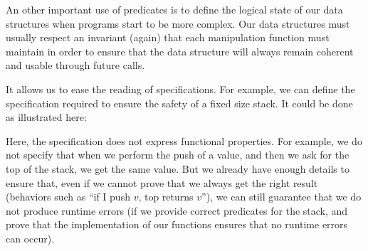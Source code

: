 

An other important use of predicates is to define the logical state of
our data structures when programs start to be more complex. Our data
structures must usually respect an invariant (again) that each
manipulation function must maintain in order to ensure that the data
structure will always remain coherent and usable through future calls.



It allows us to ease the reading of specifications. For example, we can
define the specification required to ensure the safety of a fixed size
stack. It could be done as illustrated here:






Here, the specification does not express functional properties. For
example, we do not specify that when we perform the push of a value, and
then we ask for the top of the stack, we get the same value. But we
already have enough details to ensure that, even if we cannot prove that
we always get the right result (behaviors such as ``if I push \(v\), top
returns \(v\)''), we can still guarantee that we do not produce runtime
errors (if we provide correct predicates for the stack, and prove
that the implementation of our functions ensures that no runtime errors
can occur).

